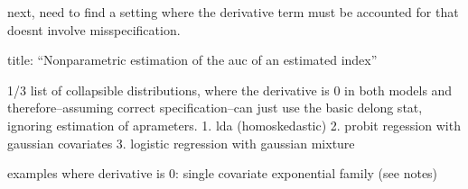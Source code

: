 \documentclass{article}
\begin{document}
next, need to find a setting where the derivative term must be
accounted for that doesnt involve misspecification.


title: ``Nonparametric estimation of the auc of an estimated index''


1/3
list of collapsible distributions, where the derivative is 0 in both
models and therefore--assuming correct specification--can just use the
basic delong stat, ignoring estimation of aprameters.
1. lda (homoskedastic)
2. probit regession with gaussian covariates
3. logistic regression with gaussian mixture

examples where derivative is 0:
single covariate
exponential family (see notes)
\end{document}
